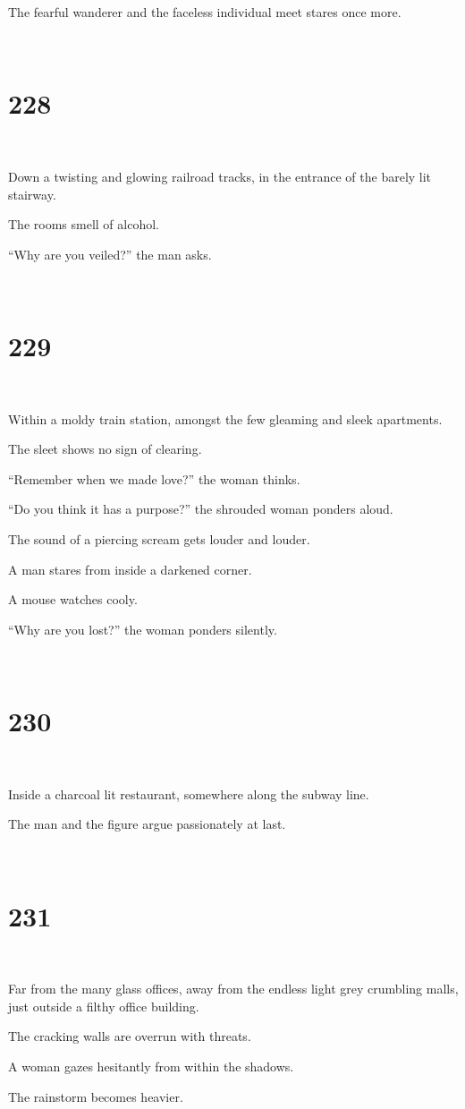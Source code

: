 \documentclass{report}
\begin{document}
The fearful wanderer and the faceless individual meet stares once more.

~
\chapter*{228}
~

Down a twisting and glowing railroad tracks, in the entrance of the barely lit stairway.

The rooms smell of alcohol.

``Why are you veiled?'' the man asks.

~
\chapter*{229}
~

Within a moldy train station, amongst the few gleaming and sleek apartments.

The sleet shows no sign of clearing.

``Remember when we made love?'' the woman thinks.

``Do you think it has a purpose?'' the shrouded woman ponders aloud.

The sound of a piercing scream gets louder and louder.

A man stares from inside a darkened corner.

A mouse watches cooly.

``Why are you lost?'' the woman ponders silently.

~
\chapter*{230}
~

Inside a charcoal lit restaurant, somewhere along the subway line.

The man and the figure argue passionately at last.

~
\chapter*{231}
~

Far from the many glass offices, away from the endless light grey crumbling malls, just outside a filthy office building.

The cracking walls are overrun with threats.

A woman gazes hesitantly from within the shadows.

The rainstorm becomes heavier.
\end{document}
